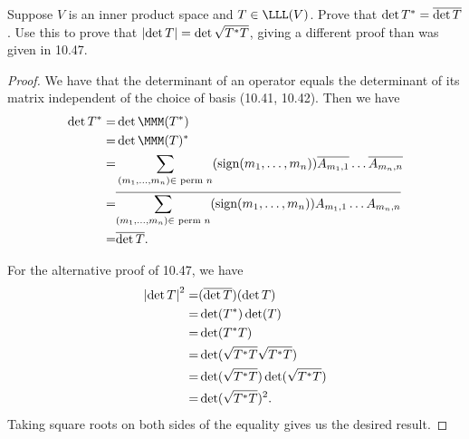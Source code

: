\begin{exercise}{8}
  Suppose $V$ is an inner product space and $T\in\LLL(V)$. Prove that $\operatorname*{det} T^\ast=\overline{\operatorname*{det} T}$. Use this to prove that $\left\lvert \operatorname*{det} T\right\rvert=\operatorname*{det}\sqrt{T^\ast T}$, giving a different proof than was given in 10.47.
\end{exercise}
\begin{proof}
 We have that the determinant of an operator equals the determinant of its matrix independent of the choice of basis (10.41, 10.42). Then we have
 \begin{align*}
     \det T^\ast =& \det\MMM(T^\ast)\\
     =& \det\MMM(T)^\ast\\
     =& \sum_{(m_1,\dots,m_n)\in\text{ perm }n}(\text{sign}(m_1,\dots,m_n))\overline{A_{m_1,1}}\dots\overline{A_{m_n,n}}\\
     =& \overline{\sum_{(m_1,\dots,m_n)\in\text{ perm }n}(\text{sign}(m_1,\dots,m_n))A_{m_1,1}\dots A_{m_n,n}}\\
     =& \overline{\det T}.
 \end{align*}

 For the alternative proof of 10.47, we have 
 \begin{align*}
    \left\lvert \det T\right\rvert^2 =&(\overline{\det T})(\det T)\\
    =& \det(T^\ast)\det(T)\\ 
    =& \det(T^\ast T)\\ 
    =& \det(\sqrt{T^\ast T}\sqrt{T^\ast T})\\ 
    =& \det(\sqrt{T^\ast T})\det(\sqrt{T^\ast T})\\
    =& \det(\sqrt{T^\ast T})^2.
 \end{align*}
 Taking square roots on both sides of the equality gives us the desired result.
\end{proof}